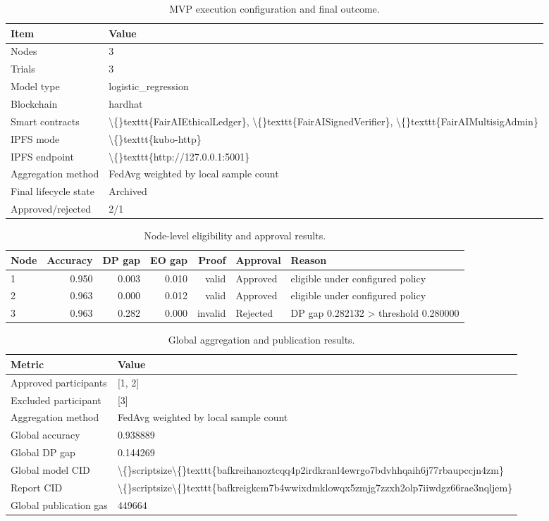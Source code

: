 \begin{table}[t]
\centering
\caption{MVP execution configuration and final outcome.}
\small
\begin{tabular}{ll}
\hline
Item & Value \\
\hline
Nodes & 3 \\
Trials & 3 \\
Model type & logistic\_regression \\
Blockchain & hardhat \\
Smart contracts & \textbackslash\{\}texttt\{FairAIEthicalLedger\}, \textbackslash\{\}texttt\{FairAISignedVerifier\}, \textbackslash\{\}texttt\{FairAIMultisigAdmin\} \\
IPFS mode & \textbackslash\{\}texttt\{kubo-http\} \\
IPFS endpoint & \textbackslash\{\}texttt\{http://127.0.0.1:5001\} \\
Aggregation method & FedAvg weighted by local sample count \\
Final lifecycle state & Archived \\
Approved/rejected & 2/1 \\
\hline
\end{tabular}
\end{table}

\begin{table}[t]
\centering
\caption{Node-level eligibility and approval results.}
\small
\begin{tabular}{lrrrrll}
\hline
Node & Accuracy & DP gap & EO gap & Proof & Approval & Reason \\
\hline
1 & 0.950 & 0.003 & 0.010 & valid & Approved & eligible under configured policy \\
2 & 0.963 & 0.000 & 0.012 & valid & Approved & eligible under configured policy \\
3 & 0.963 & 0.282 & 0.000 & invalid & Rejected & DP gap 0.282132 > threshold 0.280000 \\
\hline
\end{tabular}
\end{table}

\begin{table}[t]
\centering
\caption{Global aggregation and publication results.}
\small
\begin{tabular}{ll}
\hline
Metric & Value \\
\hline
Approved participants & [1, 2] \\
Excluded participant & [3] \\
Aggregation method & FedAvg weighted by local sample count \\
Global accuracy & 0.938889 \\
Global DP gap & 0.144269 \\
Global model CID & \textbackslash\{\}scriptsize\textbackslash\{\}texttt\{bafkreihanoztcqq4p2irdkranl4ewrgo7bdvhhqaih6j77rbaupccjn4zm\} \\
Report CID & \textbackslash\{\}scriptsize\textbackslash\{\}texttt\{bafkreigkcm7b4wwixdmklowqx5zmjg7zzxh2olp7iiwdgz66rae3nqljem\} \\
Global publication gas & 449664 \\
\hline
\end{tabular}
\end{table}

